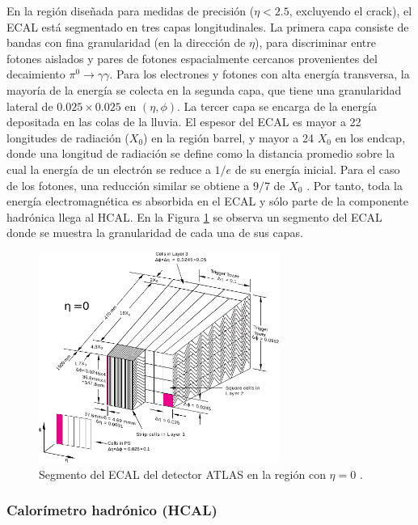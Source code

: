 En la región diseñada para medidas de precisión ($\eta < 2.5$, excluyendo el crack),
el ECAL está segmentado en tres capas longitudinales. La primera capa consiste de
bandas con fina granularidad (en la dirección de $\eta$), para discriminar entre fotones
aislados y pares de fotones espacialmente cercanos provenientes del decaimiento
$\pi^0\to\gamma\gamma$. Para los electrones y fotones con alta energía transversa, la mayoría
de la energía se colecta en la segunda capa, que tiene una granularidad lateral de
$0.025 \times 0.025$ en $(\eta, \phi)$. La tercer capa se encarga de la energía depositada en las
colas de la lluvia.
El espesor del ECAL es mayor a 22 longitudes de radiación ($X_0$) en la región
barrel, y mayor a 24 $X_0$ en los endcap, donde una longitud de radiación se define
como la distancia promedio sobre la cual la energía de un electrón se reduce a $1/e$
de su energía inicial. Para el caso de los fotones, una reducción similar se obtiene a
$9/7$ de $X_0$ . Por tanto, toda la energía electromagnética es absorbida en el ECAL y
sólo parte de la componente hadrónica llega al HCAL. En la Figura \ref{fig:ecal} se observa un segmento del ECAL donde se muestra la granularidad de cada una de sus capas.

\begin{figure}
\centering
  \includegraphics[width=0.7\textwidth]{images/lhc/ecal.pdf}
  \caption{Segmento del ECAL del detector ATLAS en la región con $\eta=0$ \cite{PERF-2017-01}.}
  \label{fig:ecal}
\end{figure}

\subsubsection{Calorímetro hadrónico (HCAL)}

